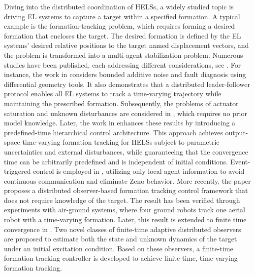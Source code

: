 Diving into the distributed coordination of HELSs, a widely studied topic is driving EL systems to capture a target within a specified formation.
A typical example is the formation-tracking problem, which requires forming a desired formation that encloses the target.
The desired formation is defined by the EL systems' desired relative positions to the target named displacement vectors, and the problem is transformed into a multi-agent stabilization problem.
Numerous studies have been published, each addressing different considerations, see \cite{liuDistributedFormationControl2015,zhaoDistributedFinitetimeTracking2015a,wangModelindependentFormationTracking2021,huangHierarchicalPredefinedtimeControl2021,jinEventtriggeredFormationControl2022,wangFinitetimeFormationTracking2025}. 
For instance, the work in \cite{liuDistributedFormationControl2015} considers bounded additive noise and fault diagnosis using differential geometry tools. 
It also demonstrates that a distributed leader-follower protocol enables all EL systems to track a time-varying trajectory while maintaining the prescribed formation. 
Subsequently, the problems of actuator saturation and unknown disturbances are considered in \cite{wangModelindependentFormationTracking2021}, which requires no prior model knowledge. 
Later, the work in \cite{huangHierarchicalPredefinedtimeControl2021} enhances these results by introducing a predefined-time hierarchical control architecture. 
This approach achieves output-space time-varying formation tracking for HELSs subject to parametric uncertainties and external disturbances, while guaranteeing that the convergence time can be arbitrarily predefined and is independent of initial conditions. 
Event-triggered control is employed in \cite{jinEventtriggeredFormationControl2022}, utilizing only local agent information to avoid continuous communication and eliminate Zeno behavior. 
More recently, the paper \cite{Wang2025} proposes a distributed observer-based  formation tracking control framework that does not require knowledge of the target.
The result has been verified through experiments with air-ground systems, where four ground robots track one aerial robot with a time-varying formation.
Later, this result is extended to finite time convergence in  \cite{wangFinitetimeFormationTracking2025}.
Two novel classes of finite-time adaptive distributed observers are proposed to estimate both the state and unknown dynamics of the target under an initial excitation condition. 
Based on these observers, a finite-time formation tracking controller is developed to achieve finite-time, time-varying formation tracking.

